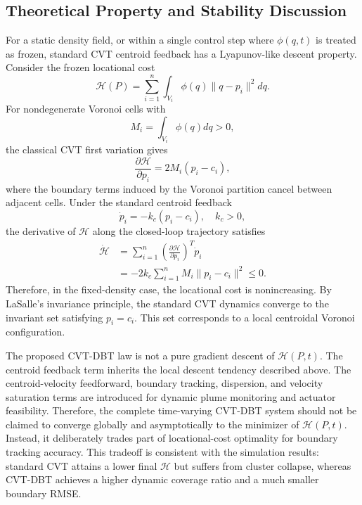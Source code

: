\documentclass[conference]{IEEEtran}
\begin{document}
\subsection{Theoretical Property and Stability Discussion}
For a static density field, or within a single control step where $\phi(q,t)$ is treated as frozen, standard CVT centroid feedback has a Lyapunov-like descent property. Consider the frozen locational cost
\begin{equation}
\mathcal{H}(P)=
\sum_{i=1}^{n}
\int_{V_i}
\phi(q)\|q-p_i\|^2dq.
\end{equation}
For nondegenerate Voronoi cells with
\begin{equation}
M_i=\int_{V_i}\phi(q)dq>0,
\end{equation}
the classical CVT first variation gives
\begin{equation}
\frac{\partial \mathcal{H}}{\partial p_i}
=2M_i(p_i-c_i),
\end{equation}
where the boundary terms induced by the Voronoi partition cancel between adjacent cells. Under the standard centroid feedback
\begin{equation}
\dot p_i=-k_c(p_i-c_i),\quad k_c>0,
\end{equation}
the derivative of $\mathcal{H}$ along the closed-loop trajectory satisfies
\begin{equation}
\begin{aligned}
\dot{\mathcal{H}}
&=
\sum_{i=1}^{n}
\left(\frac{\partial \mathcal{H}}{\partial p_i}\right)^T\dot p_i \\
&=-2k_c\sum_{i=1}^{n}M_i\|p_i-c_i\|^2\leq0.
\end{aligned}
\end{equation}
Therefore, in the fixed-density case, the locational cost is nonincreasing. By LaSalle's invariance principle, the standard CVT dynamics converge to the invariant set satisfying $p_i=c_i$. This set corresponds to a local centroidal Voronoi configuration.

The proposed CVT-DBT law is not a pure gradient descent of $\mathcal{H}(P,t)$. The centroid feedback term inherits the local descent tendency described above. The centroid-velocity feedforward, boundary tracking, dispersion, and velocity saturation terms are introduced for dynamic plume monitoring and actuator feasibility. Therefore, the complete time-varying CVT-DBT system should not be claimed to converge globally and asymptotically to the minimizer of $\mathcal{H}(P,t)$. Instead, it deliberately trades part of locational-cost optimality for boundary tracking accuracy. This tradeoff is consistent with the simulation results: standard CVT attains a lower final $\mathcal{H}$ but suffers from cluster collapse, whereas CVT-DBT achieves a higher dynamic coverage ratio and a much smaller boundary RMSE.
\end{document}

